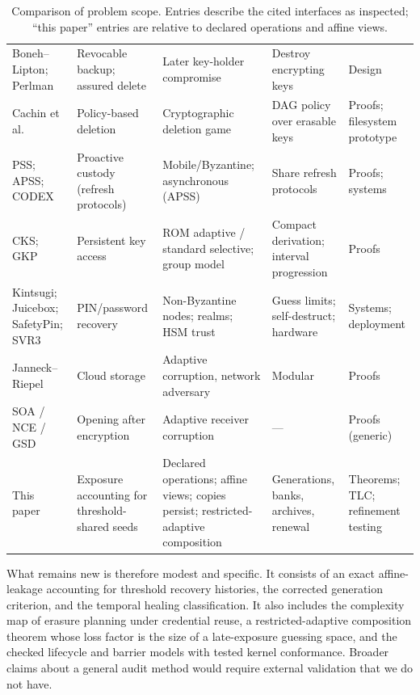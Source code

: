 \documentclass[pdflatex,sn-mathphys-num,twocolumn]{sn-jnl}
\theoremstyle{plain}
\theoremstyle{definition}
\begin{document}
\begin{table}[t]
\caption{Comparison of problem scope. Entries describe the cited interfaces as inspected; ``this paper'' entries are relative to declared operations and affine views.}\label{tab:comparison}
\centering\footnotesize
\altrows
\begin{tabularx}{\linewidth}{@{}p{.15\linewidth}YYYY@{}}\toprule
{} &  &  &  & \\\midrule
Boneh--Lipton; Perlman & Revocable backup; assured delete & Later key-holder compromise & Destroy encrypting keys & Design\\
Cachin et al. & Policy-based deletion & Cryptographic deletion game & DAG policy over erasable keys & Proofs; filesystem prototype\\
PSS; APSS; CODEX & Proactive custody (refresh protocols) & Mobile/Byzantine; asynchronous (APSS) & Share refresh protocols & Proofs; systems\\
CKS; GKP & Persistent key access & ROM adaptive / standard selective; group model & Compact derivation; interval progression & Proofs\\
Kintsugi; Juicebox; SafetyPin; SVR3 & PIN/password recovery & Non-Byzantine nodes; realms; HSM trust & Guess limits; self-destruct; hardware & Systems; deployment\\
Janneck--Riepel & Cloud storage & Adaptive corruption, network adversary & Modular & Proofs\\
SOA / NCE / GSD & Opening after encryption & Adaptive receiver corruption & --- & Proofs (generic)\\
This paper & Exposure accounting for threshold-shared seeds & Declared operations; affine views; copies persist; restricted-adaptive composition & Generations, banks, archives, renewal & Theorems; TLC; refinement testing\\\bottomrule
\end{tabularx}
\end{table}

What remains new is therefore modest and specific. It consists of an exact affine-leakage accounting for threshold recovery histories, the corrected generation criterion, and the temporal healing classification. It also includes the complexity map of erasure planning under credential reuse, a restricted-adaptive composition theorem whose loss factor is the size of a late-exposure guessing space, and the checked lifecycle and barrier models with tested kernel conformance. Broader claims about a general audit method would require external validation that we do not have.
\end{document}
